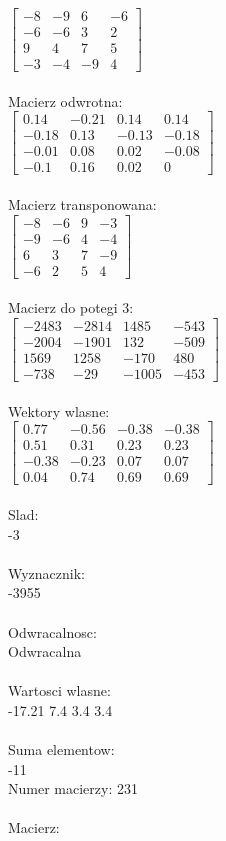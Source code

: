 \documentclass[a4paper,12pt]{article}
\begin{document}
$\begin{bmatrix} -8&-9&6&-6\\-6&-6&3&2\\9&4&7&5\\-3&-4&-9&4 \end{bmatrix}$
\\
\\
Macierz odwrotna:\\

$\begin{bmatrix} 0.14&-0.21&0.14&0.14\\-0.18&0.13&-0.13&-0.18\\-0.01&0.08&0.02&-0.08\\-0.1&0.16&0.02&0 \end{bmatrix}$
\\
\\
Macierz transponowana:\\

$\begin{bmatrix} -8&-6&9&-3\\-9&-6&4&-4\\6&3&7&-9\\-6&2&5&4 \end{bmatrix}$
\\
\\
Macierz do potegi 3:\\

$\begin{bmatrix} -2483&-2814&1485&-543\\-2004&-1901&132&-509\\1569&1258&-170&480\\-738&-29&-1005&-453 \end{bmatrix}$
\\
\\
Wektory wlasne:\\

$\begin{bmatrix} 0.77&-0.56&-0.38&-0.38\\0.51&0.31&0.23&0.23\\-0.38&-0.23&0.07&0.07\\0.04&0.74&0.69&0.69 \end{bmatrix}$
\\
\\
Slad:\\
-3
\\
\\
Wyznacznik:\\
-3955
\\
\\
Odwracalnosc:\\
Odwracalna
\\
\\
Wartosci wlasne:\\
-17.21 7.4 3.4 3.4
\\
\\
Suma elementow:\\
-11
\\
\newpage
Numer macierzy:
231
\\
\\
Macierz:\\
\end{document}
